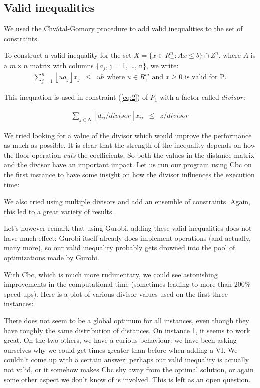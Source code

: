 \documentclass[a4paper,10pt]{article}
\begin{document}
\subsection{Valid inequalities}

We used the Chv\'atal-Gomory procedure to add valid inequalities to the set of constraints.

To construct a valid inequality for the set $ X = \{x \in R^n_{+}: Ax \leq b \} \cap Z^n$, where $A$ is a $m \times n$ matrix with columns \{$a_j$, j = 1, \ldots, n\}, we write:
\begin{eqnarray*}
    \sum_{j=1}^n \left \lfloor{ua_j}\right \rfloor x_j & \leq & ub ~~ \text{where $u \in R^m_{+}$ and $x \geq 0$ is valid for P.}
\end{eqnarray*}

This inequation is used in constraint (\ref{eq:2}) of $P_1$ with a factor called $divisor$:
 
	\begin{eqnarray}
	 \sum_{j \in N} \left \lfloor{d_{ij}/divisor}\right \rfloor x_{ij} &\leq& z/divisor \label{eq:2_VI}
	\end{eqnarray}
	
We tried looking for a value of the divisor which would improve the performance as much as possible. It is clear that the strength of the inequality depends on how the floor operation \textit{cuts} the coefficients. So both the values in the distance matrix and the divisor have an important impact. Let us run our program using Cbc on the first instance to have some insight on how the divisor influences the execution time:




We also tried using multiple divisors and add an ensemble of constraints. Again, this led to a great variety of results.

Let's however remark that using Gurobi, adding these valid inequalities does not have much effect: Gurobi itself already does implement operations (and actually, many more), so our valid inequality probably gets drowned into the pool of optimizations made by Gurobi. 

With Cbc, which is much more rudimentary, we could see astonishing improvements in the computational time (sometimes leading to more than 200\% speed-ups). Here is a plot of various divisor values used on the first three instances:



There does not seem to be a global optimum for all instances, even though they have roughly the same distribution of distances. On instance 1, it seems to work great. On the two others, we have a curious behaviour: we have been asking ourselves why we could get times greater than before when adding a VI. We couldn't come up with a certain answer: perhaps our valid inequality is actually not valid, or it somehow makes Cbc shy away from the optimal solution, or again some other aspect we don't know of is involved. This is left as an open question.
\end{document}
